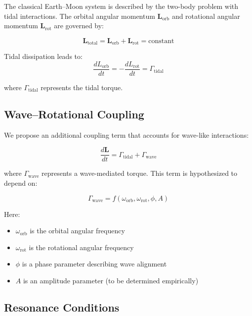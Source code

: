 \documentclass[12pt,a4paper]{article}
\begin{document}
The classical Earth–Moon system is described by the two-body problem with tidal interactions. The orbital angular momentum $\mathbf{L}_{\text{orb}}$ and rotational angular momentum $\mathbf{L}_{\text{rot}}$ are governed by:

\begin{equation}
\mathbf{L}_{\text{total}} = \mathbf{L}_{\text{orb}} + \mathbf{L}_{\text{rot}} = \text{constant}
\end{equation}

Tidal dissipation leads to:
\begin{equation}
\frac{dL_{\text{orb}}}{dt} = -\frac{dL_{\text{rot}}}{dt} = \Gamma_{\text{tidal}}
\end{equation}

where $\Gamma_{\text{tidal}}$ represents the tidal torque.

\subsection{Wave–Rotational Coupling}

We propose an additional coupling term that accounts for wave-like interactions:

\begin{equation}
\frac{d\mathbf{L}}{dt} = \Gamma_{\text{tidal}} + \Gamma_{\text{wave}}
\end{equation}

where $\Gamma_{\text{wave}}$ represents a wave-mediated torque. This term is hypothesized to depend on:

\begin{equation}
\Gamma_{\text{wave}} = f(\omega_{\text{orb}}, \omega_{\text{rot}}, \phi, A)
\end{equation}

Here:
\begin{itemize}
    \item $\omega_{\text{orb}}$ is the orbital angular frequency
    \item $\omega_{\text{rot}}$ is the rotational angular frequency
    \item $\phi$ is a phase parameter describing wave alignment
    \item $A$ is an amplitude parameter (to be determined empirically)
\end{itemize}

\subsection{Resonance Conditions}
\end{document}
